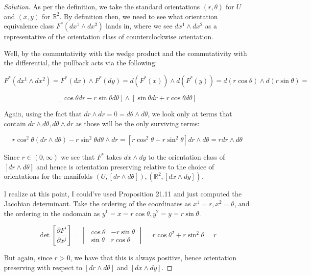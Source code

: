 \documentclass[10pt]{article}
\theoremstyle{nonumberplain}%
\begin{document}
\begin{proof}[Solution]

As per the definition, we take the standard orientations $(r,\theta)$ for $U$ and $(x,y)$ for $\mathbb{R}^2$. By definition then, we need to see what orientation equivalence class $F^*(dx^1 \wedge dx^2)$ lands in, where we see $dx^1 \wedge dx^2$ as a representative of the orientation class of counterclockwise orientation.

Well, by the commutativity with the wedge product and the commutativity with the differential, the pullback acts via the following:

$$ F^*(dx^1 \wedge dx^2) =  F^*(dx) \wedge F^*(dy) = d(F^*(x)) \wedge d(F^*(y)) = d(r \cos \theta) \wedge d(r \sin \theta)  =$$

$$ [ \cos \theta dr - r \sin \theta d\theta ] \wedge [ \sin \theta dr + r \cos \theta d\theta ]$$

Again, using the fact that $dr \wedge dr = 0 = d \theta \wedge d\theta$, we look only at terms that contain $dr \wedge d\theta, d\theta \wedge dr$ as those will be the only surviving terms:

$$ r \cos^2 \theta( dr \wedge d\theta) - r \sin^2 \theta d\theta \wedge dr = [ r\cos^2 \theta + r \sin^2 \theta] dr \wedge d\theta  = r dr \wedge d\theta$$

Since $r \in (0,\infty)$ we see that $F^*$ takes $dx \wedge dy$ to the orientation class of $[dr \wedge d\theta]$ and hence is orientation preserving relative to the choice of orientations for the manifolds $(U, [dr \wedge d\theta]), (\mathbb{R}^2, [dx \wedge dy])$.

I realize at this point, I could've used Proposition 21.11 and just computed the Jacobian determinant. Take the ordering of the coordinates as $x^1 = r, x^2 = \theta$, and the ordering in the codomain as $y^1 =x = r \cos \theta, y^2 = y = r \sin \theta$.

$$ \det\left[ \frac{\partial F^i}{\partial x^j} \right] = \begin{vmatrix} \cos \theta & -r\sin\theta \\ \sin \theta & r \cos \theta \end{vmatrix} = r \cos \theta^2 + r \sin^2 \theta = r$$

But again, since $ r > 0$, we have that this is always positive, hence orientation preserving with respect to $[dr \wedge d\theta]$ and $[dx \wedge dy]$.



\end{proof}
\end{document}
